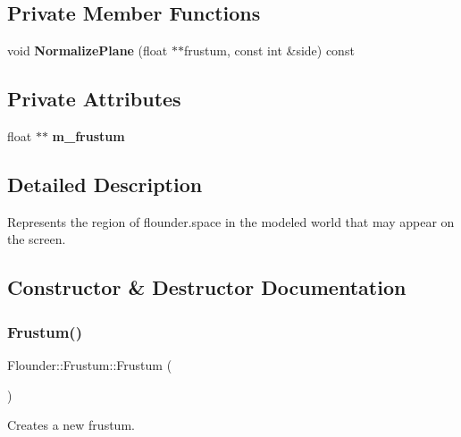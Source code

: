 \subsection*{Private Member Functions}
\begin{DoxyCompactItemize}
\item 
\mbox{\label{class_flounder_1_1_frustum_afa3cd3014b659793e6a89147d42b1650}} 
void {\bfseries Normalize\+Plane} (float $\ast$$\ast$frustum, const int \&side) const
\end{DoxyCompactItemize}
\subsection*{Private Attributes}
\begin{DoxyCompactItemize}
\item 
\mbox{\label{class_flounder_1_1_frustum_af2063f90d25049c1eccf4c8132d0799b}} 
float $\ast$$\ast$ {\bfseries m\+\_\+frustum}
\end{DoxyCompactItemize}


\subsection{Detailed Description}
Represents the region of flounder.\+space in the modeled world that may appear on the screen. 



\subsection{Constructor \& Destructor Documentation}
\mbox{\label{class_flounder_1_1_frustum_a148f8368655a90d1b4e6e35e1e4bcb2f}} 
\subsubsection{\texorpdfstring{Frustum()}{Frustum()}}
{\footnotesize\ttfamily Flounder\+::\+Frustum\+::\+Frustum (\begin{DoxyParamCaption}{ }\end{DoxyParamCaption})}



Creates a new frustum. 

